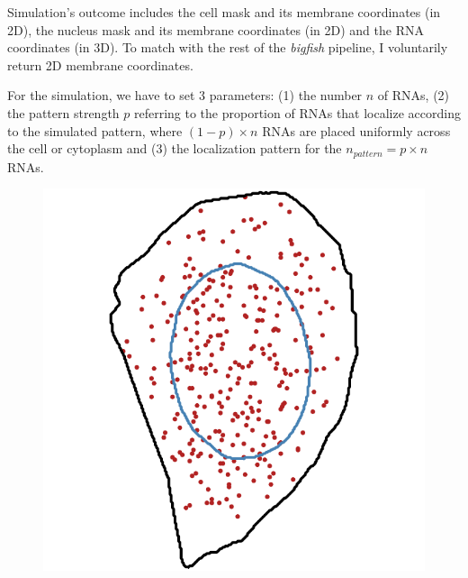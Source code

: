 Simulation's outcome includes the cell mask and its membrane coordinates (in 2D), the nucleus mask and its membrane coordinates (in 2D) and the \ac{RNA} coordinates (in 3D).
To match with the rest of the \emph{bigfish} pipeline, I voluntarily return 2D membrane coordinates.

For the simulation, we have to set 3 parameters: (1) the number $n$ of \ac{RNA}s, (2) the pattern strength $p$ referring to the proportion of \ac{RNA}s that localize according to the simulated pattern, where $(1-p) \times n$ \ac{RNA}s are placed uniformly across the cell or cytoplasm and (3) the localization pattern for the $n_{pattern} = p \times n$ \ac{RNA}s. 

\begin{figure}[]
	\centering
		\includegraphics[width=\linewidth]{figures/chapter4/simulation_perinuclear_10}
	\endminipage\hfill

\end{figure}
